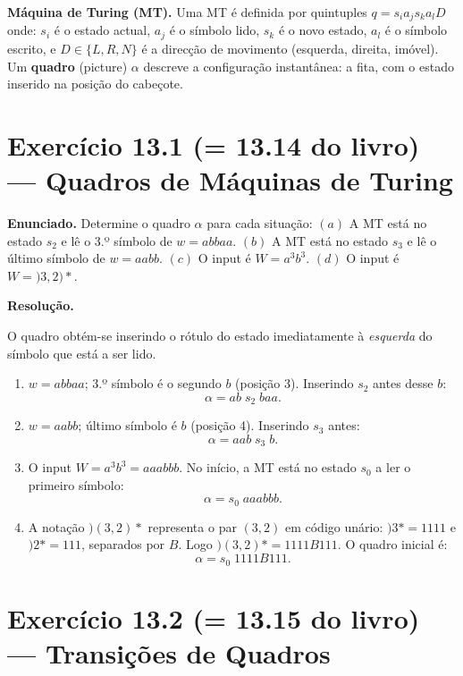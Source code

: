 \documentclass[12pt,a4paper]{article}
\newcommand{\keyword}[1]{\textbf{\textcolor{azul}{#1}}}
\begin{document}
\begin{teoriacaixa}
\textbf{Máquina de Turing (MT).}
Uma MT é definida por quintuples $q = s_i a_j s_k a_l D$ onde:
$s_i$ é o estado actual, $a_j$ é o símbolo lido, $s_k$ é o novo estado,
$a_l$ é o símbolo escrito, e $D \in \{L, R, N\}$ é a direcção de movimento
(esquerda, direita, imóvel). Um \keyword{quadro} (picture) $\alpha$ descreve
a configuração instantânea: a fita, com o estado inserido na posição do cabeçote.
\end{teoriacaixa}

\section*{Exercício 13.1 (= 13.14 do livro) — Quadros de Máquinas de Turing}

\textbf{Enunciado.} Determine o quadro $\alpha$ para cada situação:
$(a)$ A MT está no estado $s_2$ e lê o 3.º símbolo de $w = abbaa$.
$(b)$ A MT está no estado $s_3$ e lê o último símbolo de $w = aabb$.
$(c)$ O input é $W = a^3b^3$.
$(d)$ O input é $W = {)}3{,}2{)}*$.

\medskip
\textbf{Resolução.}

O quadro obtém-se inserindo o rótulo do estado imediatamente à \emph{esquerda} do símbolo
que está a ser lido.

\begin{enumerate}[label=(\alph*)]
  \item $w = abbaa$; 3.º símbolo é o segundo $b$ (posição 3). Inserindo $s_2$ antes desse $b$:
        \[
          \alpha = ab\;s_2\;baa.
        \]

  \item $w = aabb$; último símbolo é $b$ (posição 4). Inserindo $s_3$ antes:
        \[
          \alpha = aab\;s_3\;b.
        \]

  \item O input $W = a^3b^3 = aaabbb$. No início, a MT está no estado $s_0$ a ler o
        primeiro símbolo:
        \[
          \alpha = s_0\;aaabbb.
        \]

  \item A notação $)(3,2)*$ representa o par $(3,2)$ em código unário: $)3* = 1111$
        e $)2* = 111$, separados por $B$. Logo $)(3,2)* = 1111B111$.
        O quadro inicial é:
        \[
          \alpha = s_0\;1111B111.
        \]
\end{enumerate}

\section*{Exercício 13.2 (= 13.15 do livro) — Transições de Quadros}
\end{document}
